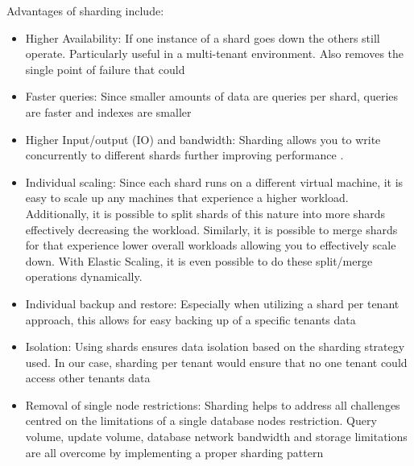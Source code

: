 Advantages of sharding include:
\begin{itemize}
\item Higher Availability: If one instance of a shard goes down the others still operate. Particularly useful in a multi-tenant environment. Also removes the single point of failure that could
\item Faster queries: Since smaller amounts of data are queries per shard, queries are faster and indexes are smaller
\item Higher Input/output (IO) and bandwidth: Sharding allows you to write concurrently to different shards further improving performance \cite{Rahul2008-vo}.
\item Individual scaling: Since each shard runs on a different virtual machine, it is easy to scale up any machines that experience a higher workload. Additionally, it is possible to split shards of this nature into more shards effectively decreasing the workload. Similarly, it is possible to merge shards for that experience lower overall workloads allowing you to effectively scale down. With Elastic Scaling, it is even possible to do these split/merge operations dynamically.
\item Individual backup and restore: Especially when utilizing a shard per tenant approach, this allows for easy backing up of a specific tenants data
\item Isolation: Using shards ensures data isolation based on the sharding strategy used. In our case, sharding per tenant would ensure that no one tenant could access other tenants data
\item Removal of single node restrictions: Sharding helps to address all challenges centred on the limitations of a single database nodes restriction. Query volume, update volume, database network bandwidth and storage limitations are all overcome by implementing a proper sharding pattern \cite{Wilder2012-so}
 \end{itemize}
 
